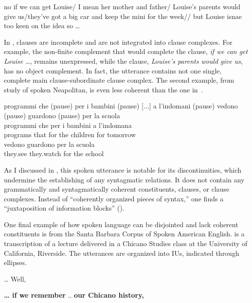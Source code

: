 \ea%
    \label{ex:7:1}



no if we can get Louise/ I mean her mother and father/ Louise’s parents would give us/they’ve got a big car and keep the mini for the week// but Louise isnae too keen on the idea so …
    \z

\noindent In , clauses are incomplete and are not integrated into clause complexes. For example, the non-finite complement that would complete the clause, \textit{if we can get Louise …}, remains unexpressed, while the clause, \textit{Louise’s parents would give us}, has no object complement. In fact, the utterance contains not one single, complete main clause-subordinate clause complex. The second example, from  study of spoken Neapolitan, is even less coherent than the one in~.

\ea%
    \label{ex:7:2}
    programmi che (pause) per i bambini (pause) [...] a l'indomani (pause) vedono (pause) guardono (pause) per la scuola \\
\gll         programmi   che per   i   bambini   a l’indomana \\
  programs   that  for  the   children      for tomorrow\\

\gll vedono  guardono   per la scuola\\
they.see     they.watch  for the school\\
    \z

\noindent As I discussed in , this spoken utterance is notable for its discontinuities, which undermine the establishing of any syntagmatic relations. It does not contain any grammatically and syntagmatically coherent constituents, clauses, or clause complexes. Instead of “coherently organized pieces of syntax,” one finds a “juxtaposition of information blocks” (\citealt[60]{MillerWeinert1998}).

One final example of how spoken language can be disjointed and lack coherent constituents is from the Santa Barbara Corpus of Spoken American English.  is a transcription of a lecture delivered in a Chicano Studies class at the University of California, Riverside. The utterances are organized into IUs, indicated through ellipses.

\ea%
    \label{ex:7:3}



… Well,

\textbf{… if we remember} .. \textbf{our Chicano history,}

